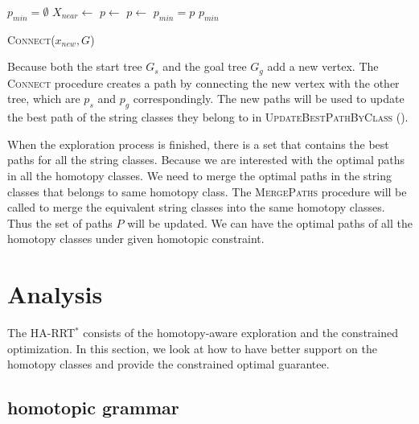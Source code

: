 \documentclass[letterpaper, 10 pt, conference]{ieeeconf}
\begin{document}
\begin{algorithm}[hbtp]
	\begin{algorithmic}[1]
		\State $ p_{min} = \emptyset $
		\State $ X_{near} \leftarrow $ 
					\State $ p \leftarrow $ 
				\Else
				    \State $ p \leftarrow $ 			
				\EndIf
			    	\State $ p_{min} = p $
			    \EndIf 
			\EndIf
		\EndFor
		\Return $ p_{min} $
	\end{algorithmic}
	\caption{ \textsc{Connect}($ x_{new}, G $) }
	\label{alg:harrt:binding}
\end{algorithm}

Because both the start tree $ G_{s} $ and the goal tree $ G_{g} $ add a new vertex. 
The \textsc{Connect} procedure creates a path by connecting the new vertex with the other tree, which are $ p_{s} $ and $ p_{g} $ correspondingly.
The new paths will be used to update the best path of the string classes they belong to in \textsc{UpdateBestPathByClass} ().

When the exploration process is finished, there is a set that contains the best paths for all the string classes.
Because we are interested with the optimal paths in all the homotopy classes.
We need to merge the optimal paths in the string classes that belongs to same homotopy class.
The \textsc{MergePaths} procedure will be called to merge the equivalent string classes into the same homotopy classes. 
Thus the set of paths $ P $ will be updated.
We can have the optimal paths of all the homotopy classes under given homotopic constraint.

\section{Analysis}
\label{sec:analysis}

The HA-RRT$^{*}$ consists of the homotopy-aware exploration and the constrained optimization.
In this section, we look at how to have better support on the homotopy classes and provide the constrained optimal guarantee.

\subsection{homotopic grammar}
\label{sec:homotopic_grammar}
\end{document}
